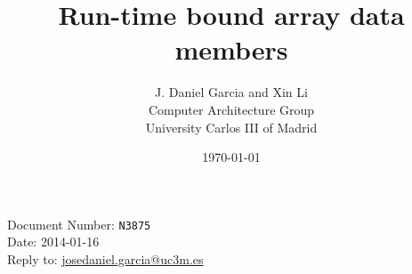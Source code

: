 \documentclass[10pt,a4paper,oneside,final,notitlepage]{article}%
\begin{document}
\begin{flushright}
Document Number: \texttt{N3875}\\
Date: 2014-01-16\\
Reply to: \url{josedaniel.garcia@uc3m.es}
\end{flushright}

\title{Run-time bound array data members}
\author{J. Daniel Garcia and Xin Li\\
Computer Architecture Group\\
University Carlos III of Madrid
}
\date{\today}

\begingroup
\let\newpage\relax%
\maketitle
\endgroup







\end{document}

